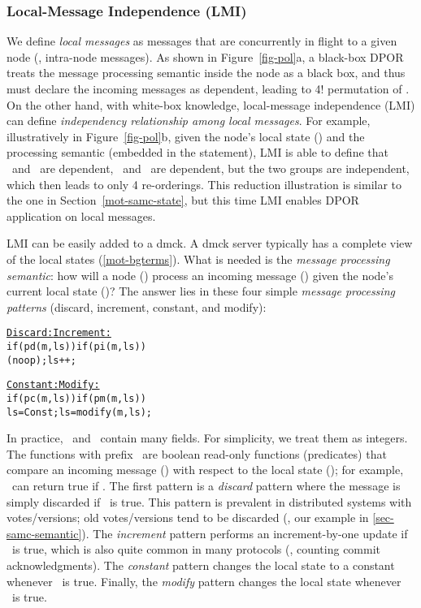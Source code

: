 
\subsubsection{Local-Message Independence (LMI)}
\label{sam-lmi}

We define {\em local messages} as messages that are concurrently in
flight to a given node (\ie, intra-node messages).  As shown in
Figure~\ref{fig-pol}a, a black-box DPOR treats the message processing
semantic inside the node as a black box, and thus must declare the
incoming messages as dependent, leading to 4! permutation
of \ma\mb\mc\md.  On the other hand, with white-box knowledge,
local-message independence (LMI) can define {\em independency
relationship among local messages}.  For example, illustratively in
Figure~\ref{fig-pol}b, given the node's local state (\ls) and the
processing semantic (embedded in the  statement), LMI is able
to define that \ma\ and \mb\ are dependent, \mc\ and \md\ are
dependent, but the two groups are independent, which then leads to
only 4 re-orderings.  This reduction illustration is similar to the
one in Section~\ref{mot-samc-state}, but this time LMI enables DPOR
application on local messages.


LMI can be easily added to a dmck.  A dmck server typically has a
complete view of the local states (\sec\ref{mot-bgterms}).  What is
needed is the {\em message processing semantic}: how will a node (\nn)
process an incoming message (\mm) given the node's current local state
(\ls)?  The answer lies in these four simple {\em message processing
patterns} (discard, increment, constant, and modify):

\begin{minipage}{\textwidth}
\begin{alltt}
\vfive
     \underline{Discard:}           \underline{Increment:}  
     if (pd(m,ls))      if (pi(m,ls))
      (noop);             ls++;       

     \underline{Constant:}          \underline{Modify:}  
     if (pc(m,ls))      if (pm(m,ls))
       ls = Const;        ls = modify(m,ls);
\end{alltt}
\vfive
\end{minipage}

In practice, \ls\ and \mm\ contain many fields.  For simplicity, we
treat them as integers.  The functions with prefix \pp\ are boolean
read-only functions (predicates) that compare an incoming message
(\mm) with respect to the local state (\ls); for example, \pd\ can
return true if .  The first pattern is a {\em discard} pattern
where the message is simply discarded if \pd\ is true.  This pattern
is prevalent in distributed systems with votes/versions; old
votes/versions tend to be discarded (\eg, our example
in \sec\ref{sec-samc-semantic}).  The {\em increment} pattern performs an
increment-by-one update if \pi\ is true, which is also quite common in
many protocols (\eg, counting commit acknowledgments).  The {\em
constant} pattern changes the local state to a constant whenever \pc\
is true.  Finally, the {\em modify} pattern changes the local state
whenever \pm\ is true.


